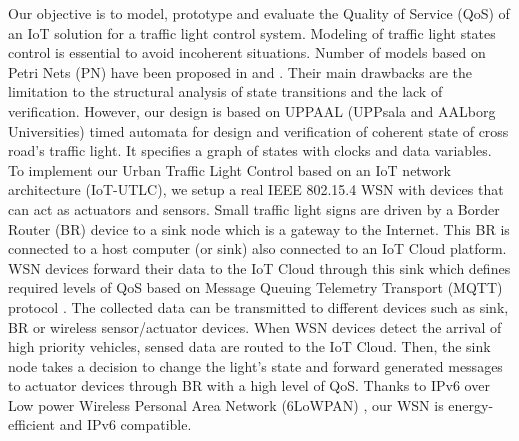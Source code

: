 Our objective is to model, prototype and evaluate the Quality of Service (QoS) of an IoT solution for a traffic light control system. Modeling  of traffic light states control is essential to avoid incoherent situations. Number of models based on Petri Nets (PN) have been proposed in \cite{difebbraro_trafficresponsive_2006} and \cite{huang_modular_2014}. Their main drawbacks are the limitation to the structural analysis of state transitions and the lack of verification. However, our design is based on UPPAAL (UPPsala and AALborg Universities) \cite{david_uppaal_2015} timed automata for design and verification of coherent state of cross road's traffic light. It specifies a graph of states with clocks and data variables. To implement our Urban Traffic Light Control based on an IoT network architecture (IoT-UTLC), we setup a real IEEE 802.15.4 WSN with devices that can act as actuators and sensors. Small traffic light signs are driven by a Border Router (BR) device  to a sink node which is a gateway to the Internet. This BR is connected to a host computer (or sink) also connected to an IoT Cloud platform. WSN devices forward their data to the IoT Cloud through this sink which defines required levels of QoS based on Message Queuing Telemetry Transport (MQTT) protocol \cite{Al-Fuqaha2015}. The collected data can be transmitted to different devices such as sink, BR or wireless sensor/actuator devices. When WSN devices detect the arrival of high priority vehicles, sensed data are routed to the IoT Cloud.
Then, the sink node takes a decision to change the light's state and forward generated messages to actuator devices through BR with a high level of QoS.
Thanks to IPv6 over Low power Wireless Personal Area Network (6LoWPAN) \cite{chalappuram_development_2016},
	our WSN is energy-efficient and IPv6 compatible.


